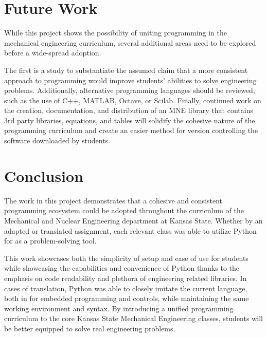 \section{Future Work}

While this project shows the possibility of uniting programming in the mechanical 
engineering curriculum, several additional areas need to be explored before a 
wide-spread adoption. 

The first is a study to substantiate the assumed claim that a more 
consistent approach to programming would improve students' abilities to solve
engineering problems. Additionally, alternative programming languages should be
reviewed, such as the use of C++, MATLAB, Octave, or Scilab. 
Finally, continued work on the creation, documentation, and distribution
of an MNE library that contains 3rd party libraries, equations, and tables
will solidify the cohesive nature of the programming curriculum and create an
easier method for version controlling the software downloaded by students.

\section{Conclusion}

The work in this project demonstrates that a cohesive and consistent programming 
ecosystem could be adopted throughout the curriculum of the Mechanical and 
Nuclear Engineering department at Kansas State. Whether by an adapted or translated
assignment, each relevant class was able to utilize Python for as a problem-solving 
tool. 

This work showcases both the simplicity of setup and ease of use for students
while showcasing the capabilities and convenience of Python thanks to the 
emphasis on code readability and plethora of engineering related libraries.
In cases of translation, Python was able to closely imitate the current language,
both in for embedded programming and controls, while maintaining the same 
working environment and syntax. By introducing a unified programming curriculum
to the core Kansas State Mechanical Engineering classes, students will be better
equipped to solve real engineering problems.
